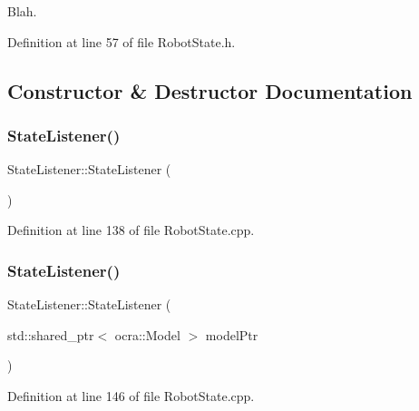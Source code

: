 Blah. 

Definition at line 57 of file Robot\+State.\+h.



\subsection{Constructor \& Destructor Documentation}
\hypertarget{classocra__recipes_1_1StateListener_ab2d5128398eeb9990f34a633e9a4e181}{}\label{classocra__recipes_1_1StateListener_ab2d5128398eeb9990f34a633e9a4e181} 
\subsubsection{\texorpdfstring{State\+Listener()}{StateListener()}\hspace{0.1cm}{\footnotesize\ttfamily [1/2]}}
{\footnotesize\ttfamily State\+Listener\+::\+State\+Listener (\begin{DoxyParamCaption}{ }\end{DoxyParamCaption})}



Definition at line 138 of file Robot\+State.\+cpp.

\hypertarget{classocra__recipes_1_1StateListener_a6861fabf2b226ce71ba2bcfa766a4538}{}\label{classocra__recipes_1_1StateListener_a6861fabf2b226ce71ba2bcfa766a4538} 
\subsubsection{\texorpdfstring{State\+Listener()}{StateListener()}\hspace{0.1cm}{\footnotesize\ttfamily [2/2]}}
{\footnotesize\ttfamily State\+Listener\+::\+State\+Listener (\begin{DoxyParamCaption}\item[{std\+::shared\+\_\+ptr$<$ ocra\+::\+Model $>$}]{model\+Ptr }\end{DoxyParamCaption})}



Definition at line 146 of file Robot\+State.\+cpp.

